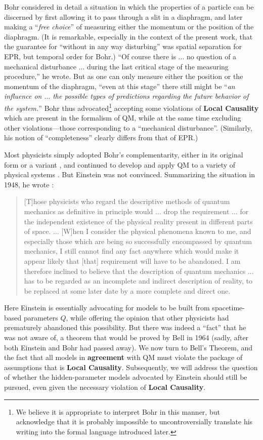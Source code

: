 \documentclass[onecolumn, nofootinbib, 12pt]{revtex4-1}
\begin{document}
Bohr considered in detail a situation in which the properties of a particle can be discerned by first allowing it to pass through a slit in a diaphragm, and later making a ``{\it free choice}'' of measuring either the momentum or the position of the diaphragm.  (It is remarkable, especially in the context of the present work, that the guarantee for ``without in any way disturbing'' was spatial separation for EPR, but temporal order for Bohr.)  ``Of course there is $\dots$ no question of a mechanical disturbance $\dots$ during the last critical stage of the measuring procedure,'' he wrote.  But as one can only measure either the position or the momentum of the diaphragm, ``even at this stage'' there still might be ``{\it an influence on $\dots$ the possible types of predictions regarding the future behavior of the system.}''  
Bohr thus advocated\footnote{We believe it is appropriate to interpret Bohr in this manner, but acknowledge that it is probably impossible to uncontroversially translate his writing into the formal language introduced later.} accepting some violations of {\bf Local Causality} which are present in the formalism of QM, while at the same time excluding other violations---those corresponding to a ``mechanical disturbance''.  (Similarly, his notion of ``completeness'' clearly differs from that of EPR.)

Most physicists simply adopted Bohr's complementarity, either in its original form or a variant \cite{bell1992}, and continued to develop and apply QM to a variety of physical systems \cite{bellHoP,mermin1986}. But Einstein was not convinced.  Summarizing the situation in 1948, he wrote \cite{born1971}:
\begin{quote}
[T]hose physicists who regard the descriptive methods of quantum mechanics as definitive in principle would $\dots$ drop the requirement $\dots$ for the independent existence of the physical reality present in different parts of space. $\dots$  [W]hen I consider the physical phenomena known to me, and especially those which are being so successfully encompassed by quantum mechanics, I still cannot find any fact anywhere which would make it appear likely that [that] requirement will have to be abandoned.  I am therefore inclined to believe that the description of quantum mechanics $\dots$ has to be regarded as an incomplete and indirect description of reality, to be replaced at some later date by a more complete and direct one.
\end{quote}
Here Einstein is essentially advocating for models to be built from spacetime-based parameters $Q$, while offering the opinion that other physicists had prematurely abandoned this possibility.  But there was indeed a ``fact'' that he was not aware of, a theorem that would be proved by Bell in 1964 (sadly, after both Einstein and Bohr had passed away).  We now turn to Bell's Theorem, and the fact that all models in {\bf agreement} with QM must violate the package of assumptions that is {\bf Local Causality}.  Subsequently, we will address the question of whether the hidden-parameter models advocated by Einstein should still be pursued, even given the necessary violation of {\bf Local Causality}.
\end{document}
